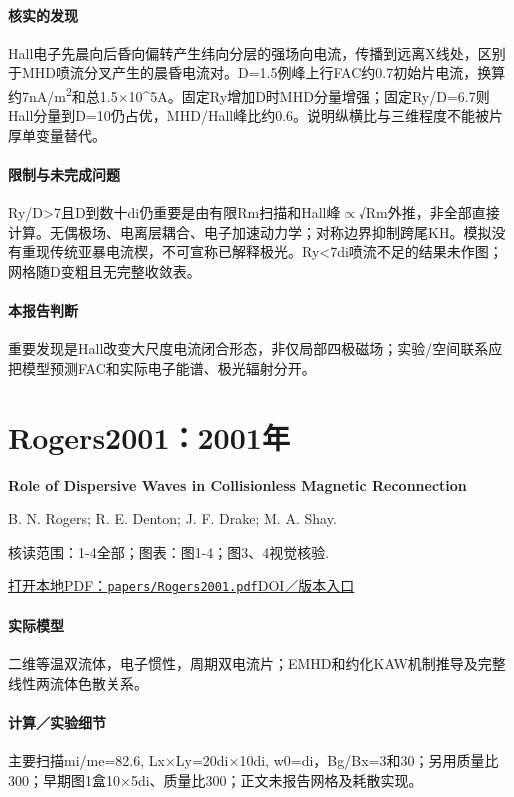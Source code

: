 \paragraph{核实的发现}Hall电子先晨向后昏向偏转产生纬向分层的强场向电流，传播到远离X线处，区别于MHD喷流分叉产生的晨昏电流对。D=1.5例峰上行FAC约0.7初始片电流，换算约7nA/m\textsuperscript{2}和总1.5×10\textasciicircum{}5A。固定Ry增加D时MHD分量增强；固定Ry/D=6.7则Hall分量到D=10仍占优，MHD/Hall峰比约0.6。说明纵横比与三维程度不能被片厚单变量替代。

\paragraph{限制与未完成问题}Ry/D>7且D到数十di仍重要是由有限Rm扫描和Hall峰\ensuremath{\propto}√Rm外推，非全部直接计算。无偶极场、电离层耦合、电子加速动力学；对称边界抑制跨尾KH。模拟没有重现传统亚暴电流楔，不可宣称已解释极光。Ry<7di喷流不足的结果未作图；网格随D变粗且无完整收敛表。

\paragraph{本报告判断}重要发现是Hall改变大尺度电流闭合形态，非仅局部四极磁场；实验/空间联系应把模型预测FAC和实际电子能谱、极光辐射分开。

\section{Rogers2001：2001年}\label{paper:Rogers2001}

\textbf{Role of Dispersive Waves in Collisionless Magnetic Reconnection}\citep{Rogers2001}\

B. N. Rogers;  R. E. Denton;  J. F. Drake;  M. A. Shay.

\textsf{核读范围：}1-4全部；\textsf{图表：}图1-4；图3、4视觉核验.

\href{run:papers/Rogers2001.pdf}{打开本地PDF：\texttt{papers/Rogers2001.pdf}}\quad\href{https://doi.org/10.1103/physrevlett.87.195004}{DOI／版本入口}

\paragraph{实际模型}二维等温双流体，电子惯性，周期双电流片；EMHD和约化KAW机制推导及完整线性两流体色散关系。

\paragraph{计算／实验细节}主要扫描mi/me=82.6, Lx×Ly=20di×10di, w0=di，Bg/Bx=3和30；另用质量比300；早期图1盒10×5di、质量比300；正文未报告网格及耗散实现。

